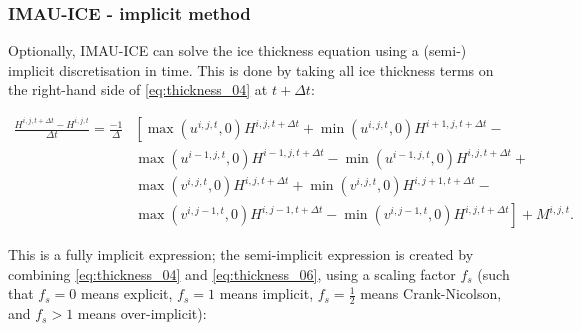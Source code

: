 \documentclass{article}
\begin{document}
\subsubsection{IMAU-ICE - implicit method}

Optionally, IMAU-ICE can solve the ice thickness equation using a (semi-) implicit discretisation in time. This is done by taking all ice thickness terms on the right-hand side of \eqref{eq:thickness_04} at $t+\Delta t$:

\begin{equation} \label{eq:thickness_06}
\begin{split}
\frac{H^{i,j,t+\Delta t} - H^{i,j,t}}{\Delta t} = \frac{-1}{\Delta} & \left[ 
\max \left( u^{i,j,t},0 \right) H^{i,j,t+\Delta t} + \min \left( u^{i,j,t},0 \right) H^{i+1,j,t+\Delta t} \right. - \\
& \left. \max \left( u^{i-1,j,t},0 \right) H^{i-1,j,t+\Delta t} - \min \left( u^{i-1,j,t},0 \right) H^{i,j,t+\Delta t} \right. + \\
& \left. \max \left( v^{i,j,t},0 \right) H^{i,j,t+\Delta t} + \min \left( v^{i,j,t},0 \right) H^{i,j+1,t+\Delta t} \right. - \\
& \left. \max \left( v^{i,j-1,t},0 \right) H^{i,j-1,t+\Delta t} - \min \left( v^{i,j-1,t},0 \right) H^{i,j,t+\Delta t} \right]
+ M^{i,j,t}.
\end{split}
\end{equation}

This is a fully implicit expression; the semi-implicit expression is created by combining \eqref{eq:thickness_04} and \eqref{eq:thickness_06}, using a scaling factor $f_s$ (such that $f_s=0$ means explicit, $f_s=1$ means implicit, $f_s=\frac12$ means Crank-Nicolson, and $f_s>1$ means over-implicit):
\end{document}

